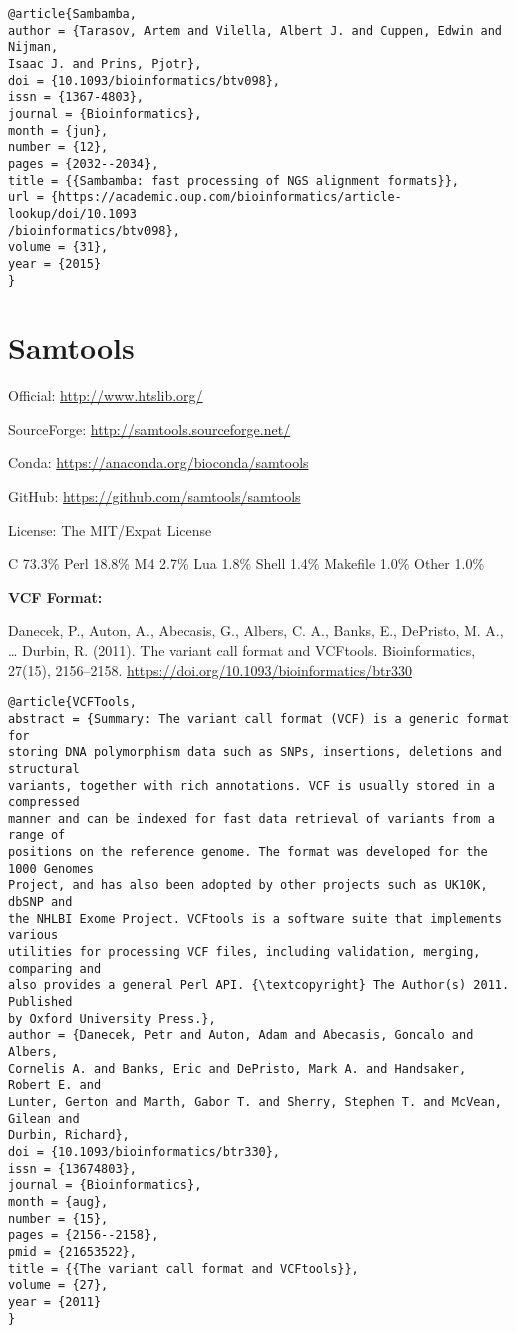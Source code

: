 \documentclass[]{article}
\begin{document}
\begin{verbatim}
@article{Sambamba,
author = {Tarasov, Artem and Vilella, Albert J. and Cuppen, Edwin and Nijman,
Isaac J. and Prins, Pjotr},
doi = {10.1093/bioinformatics/btv098},
issn = {1367-4803},
journal = {Bioinformatics},
month = {jun},
number = {12},
pages = {2032--2034},
title = {{Sambamba: fast processing of NGS alignment formats}},
url = {https://academic.oup.com/bioinformatics/article-lookup/doi/10.1093
/bioinformatics/btv098},
volume = {31},
year = {2015}
}
\end{verbatim}


\section{Samtools}

Official: \url{http://www.htslib.org/}

SourceForge: \url{http://samtools.sourceforge.net/}

Conda: \url{https://anaconda.org/bioconda/samtools}

GitHub: \url{https://github.com/samtools/samtools}

License: The MIT/Expat License

C 73.3\% Perl 18.8\% M4 2.7\% Lua 1.8\% Shell 1.4\% Makefile 1.0\% Other 1.0\%


\textbf{VCF Format:}

Danecek, P., Auton, A., Abecasis, G., Albers, C. A., Banks, E., DePristo, M. A., … Durbin, R. (2011). The variant call format and VCFtools. Bioinformatics, 27(15), 2156–2158. \url{https://doi.org/10.1093/bioinformatics/btr330}

\begin{verbatim}
@article{VCFTools,
abstract = {Summary: The variant call format (VCF) is a generic format for
storing DNA polymorphism data such as SNPs, insertions, deletions and structural
variants, together with rich annotations. VCF is usually stored in a compressed
manner and can be indexed for fast data retrieval of variants from a range of
positions on the reference genome. The format was developed for the 1000 Genomes
Project, and has also been adopted by other projects such as UK10K, dbSNP and
the NHLBI Exome Project. VCFtools is a software suite that implements various
utilities for processing VCF files, including validation, merging, comparing and
also provides a general Perl API. {\textcopyright} The Author(s) 2011. Published
by Oxford University Press.},
author = {Danecek, Petr and Auton, Adam and Abecasis, Goncalo and Albers,
Cornelis A. and Banks, Eric and DePristo, Mark A. and Handsaker, Robert E. and
Lunter, Gerton and Marth, Gabor T. and Sherry, Stephen T. and McVean, Gilean and
Durbin, Richard},
doi = {10.1093/bioinformatics/btr330},
issn = {13674803},
journal = {Bioinformatics},
month = {aug},
number = {15},
pages = {2156--2158},
pmid = {21653522},
title = {{The variant call format and VCFtools}},
volume = {27},
year = {2011}
}
\end{verbatim}
\end{document}
